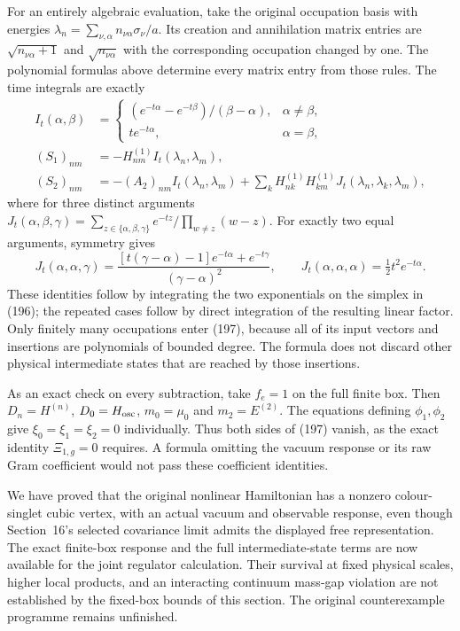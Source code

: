 \documentclass[11pt]{article}
\begin{document}
For an entirely algebraic evaluation, take the original occupation
basis with energies $\lambda_n=\sum_{\nu,\alpha}n_{\nu\alpha}
\sigma_\nu/a$. Its creation and annihilation matrix entries are
$\sqrt{n_{\nu\alpha}+1}$ and $\sqrt{n_{\nu\alpha}}$ with the
corresponding occupation changed by one. The polynomial formulas
above determine every matrix entry from those rules. The time
integrals are exactly
\begin{align}
 I_t(\alpha,\beta)&=
 \begin{cases}(e^{-t\alpha}-e^{-t\beta})/(\beta-\alpha),&\alpha\ne\beta,\\
 t e^{-t\alpha},&\alpha=\beta,
 \end{cases}\nonumber\\
 (S_1)_{nm}&=-H^{(1)}_{nm}I_t(\lambda_n,\lambda_m),\nonumber\\
 (S_2)_{nm}&=-(A_2)_{nm}I_t(\lambda_n,\lambda_m)
       +\sum_kH^{(1)}_{nk}H^{(1)}_{km}
                      J_t(\lambda_n,\lambda_k,\lambda_m),
       \label{eq:vertex-time-matrices}
\end{align}
where for three distinct arguments
$J_t(\alpha,\beta,\gamma)=
\sum_{z\in\{\alpha,\beta,\gamma\}}
e^{-tz}/\prod_{w\ne z}(w-z)$.
For exactly two equal arguments, symmetry gives
\[
 J_t(\alpha,\alpha,\gamma)=
 \frac{[t(\gamma-\alpha)-1]e^{-t\alpha}+e^{-t\gamma}}
                  {(\gamma-\alpha)^2},\qquad
 J_t(\alpha,\alpha,\alpha)=\tfrac12t^2e^{-t\alpha}.
\]
These identities follow by integrating the two exponentials on the
simplex in (196); the repeated
cases follow by direct integration of the resulting linear factor.
Only finitely many occupations enter (197), because
all of its input vectors and insertions are polynomials of bounded
degree. The formula does not discard other physical intermediate
states that are reached by those insertions.

As an exact check on every subtraction, take $f_e=1$ on the full
finite box. Then $D_n=H^{(n)}$, $D_0=H_{\rm osc}$,
$m_0=\mu_0$ and $m_2=E^{(2)}$. The equations defining
$\phi_1,\phi_2$ give $\xi_0=\xi_1=\xi_2=0$ individually.
Thus both sides of (197) vanish, as the exact
identity $\Xi_{1,g}=0$ requires. A formula omitting the vacuum
response or its raw Gram coefficient would not pass these
coefficient identities.

We have proved that the original nonlinear Hamiltonian has a nonzero
colour-singlet cubic vertex, with an actual vacuum and observable
response, even though Section~16's selected covariance limit admits
the displayed free representation. The exact finite-box response
and the full intermediate-state terms are now available for the
joint regulator calculation. Their survival at fixed physical
scales, higher local products, and an interacting continuum
mass-gap violation are not established by the fixed-box bounds
of this section. The original counterexample programme remains
unfinished.
\end{document}
